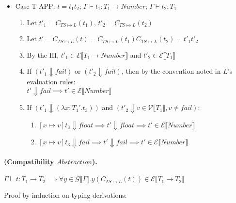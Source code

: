 \documentclass{article}
\newcommand{\denoteset}[2]{\mathcal{#1} \llbracket #2 \rrbracket}
\begin{document}
\begin{itemize}
		\item Case T-APP: $t = t_1 t_2$; $\Gamma \vdash t_1: T_1 \rightarrow Number$; $\Gamma \vdash t_2: T_1$
		\begin{enumerate}
			\item Let $t'_1 = C_{TS \mapsto L}(t_1)$, $t'_2 = C_{TS \mapsto L}(t_2)$
			\item Let $t' = C_{TS \mapsto L}(t) = C_{TS \mapsto L}(t_1) C_{TS \mapsto L}(t_2) = t'_1 t'_2$
			\item By the IH, $t'_1 \in \denoteset{E}{T_1 \rightarrow Number}$ and $t'_2 \in \denoteset{E}{T_1}$
			\item If $(t'_1 \Downarrow fail)$ or $(t'_2 \Downarrow fail)$, then by the convention noted in $L$'s evaluation rules:\\
			$t' \Downarrow fail \implies t' \in \denoteset{E}{Number}$
			\item If $(t'_1 \Downarrow (\lambda x: T_1'.t_3))$ and $(t'_2 \Downarrow v \in \denoteset{V}{T_1}, v \neq fail)$:\\
			\begin{enumerate}
				\item $[x \mapsto v]t_3 \Downarrow float \implies t' \Downarrow float \implies t' \in \denoteset{E}{Number}$
				\item $[x \mapsto v]t_3 \Downarrow fail \implies t' \Downarrow fail \implies t' \in \denoteset{E}{Number}$
			\end{enumerate}

		\end{enumerate}
	\end{itemize}

	\paragraph{(Compatibility $Abstraction$).}
	$\Gamma \vdash t: T_1 \rightarrow T_2 \implies \forall y \in \denoteset{G}{\Gamma}. y(C_{TS \mapsto L}(t)) \in \denoteset{E}{T_1 \rightarrow T_2}$

	Proof by induction on typing derivations:
	
\end{document}

